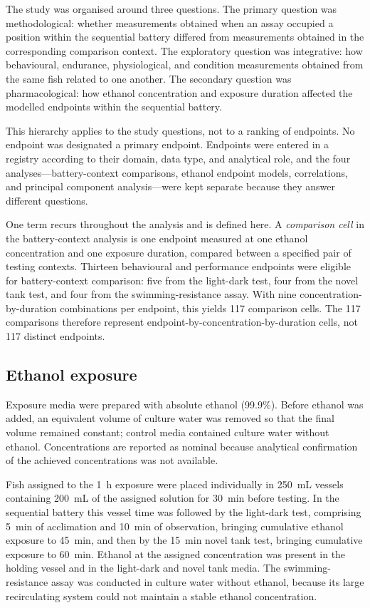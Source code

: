 \documentclass[12pt,a4paper]{article}
\begin{document}
The study was organised around three questions. The primary question was methodological: whether measurements obtained when an assay occupied a position within the sequential battery differed from measurements obtained in the corresponding comparison context. The exploratory question was integrative: how behavioural, endurance, physiological, and condition measurements obtained from the same fish related to one another. The secondary question was pharmacological: how ethanol concentration and exposure duration affected the modelled endpoints within the sequential battery.

This hierarchy applies to the study questions, not to a ranking of endpoints. No endpoint was designated a primary endpoint. Endpoints were entered in a registry according to their domain, data type, and analytical role, and the four analyses---battery-context comparisons, ethanol endpoint models, correlations, and principal component analysis---were kept separate because they answer different questions.

One term recurs throughout the analysis and is defined here. A \textit{comparison cell} in the battery-context analysis is one endpoint measured at one ethanol concentration and one exposure duration, compared between a specified pair of testing contexts. Thirteen behavioural and performance endpoints were eligible for battery-context comparison: five from the light-dark test, four from the novel tank test, and four from the swimming-resistance assay. With nine concentration-by-duration combinations per endpoint, this yields 117 comparison cells. The 117 comparisons therefore represent endpoint-by-concentration-by-duration cells, not 117 distinct endpoints.

\subsection{Ethanol exposure}
\label{sec:ethanol-exposure}
Exposure media were prepared with absolute ethanol (99.9\%). Before ethanol was added, an equivalent volume of culture water was removed so that the final volume remained constant; control media contained culture water without ethanol. Concentrations are reported as nominal because analytical confirmation of the achieved concentrations was not available.

Fish assigned to the 1~h exposure were placed individually in 250~mL vessels containing 200~mL of the assigned solution for 30~min before testing. In the sequential battery this vessel time was followed by the light-dark test, comprising 5~min of acclimation and 10~min of observation, bringing cumulative ethanol exposure to 45~min, and then by the 15~min novel tank test, bringing cumulative exposure to 60~min. Ethanol at the assigned concentration was present in the holding vessel and in the light-dark and novel tank media. The swimming-resistance assay was conducted in culture water without ethanol, because its large recirculating system could not maintain a stable ethanol concentration.
\end{document}
